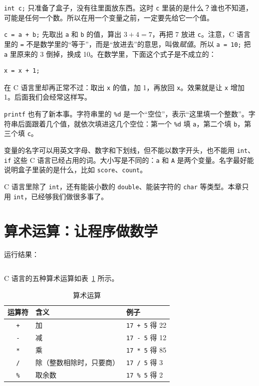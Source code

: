 \texttt{int c;} 只准备了盒子，没有往里面放东西。这时 \texttt{c} 里装的是什么？谁也不知道，可能是任何一个数。所以在用一个变量之前，一定要先给它一个值。

\texttt{c = a + b;} 先取出 \texttt{a} 和 \texttt{b} 的值，算出 $3 + 4 = 7$，再把 7 放进 \texttt{c}。注意，C 语言里的 \texttt{=} 不是数学里的“等于”，而是“放进去”的意思，叫做\emph{赋值}。所以 \texttt{a = 10;} 把 \texttt{a} 里原来的 3 倒掉，换成 10。在数学里，下面这个式子是不成立的：
\begin{verbatim}
x = x + 1;
\end{verbatim}
在 C 语言里却再正常不过：取出 \texttt{x} 的值，加 1，再放回 \texttt{x}。效果就是让 \texttt{x} 增加 1。后面我们会经常这样写。

\texttt{printf} 也有了新本事。字符串里的 \texttt{\%d} 是一个“空位”，表示“这里填一个整数”。字符串后面跟着几个值，就依次填进这几个空位：第一个 \texttt{\%d} 填 \texttt{a}，第二个填 \texttt{b}，第三个填 \texttt{c}。

变量的名字可以用英文字母、数字和下划线，但不能以数字开头，也不能用 \texttt{int}、\texttt{if} 这些 C 语言已经占用的词。大小写是不同的：\texttt{a} 和 \texttt{A} 是两个变量。名字最好能说明盒子里装的是什么，比如 \texttt{score}、\texttt{count}。

C 语言里除了 \texttt{int}，还有能装小数的 \texttt{double}、能装字符的 \texttt{char} 等类型。本章只用 \texttt{int}，已经够我们做很多事了。

\section{算术运算：让程序做数学}
\label{sec:arith}


运行结果：
\inputminted[linenos=false]{text}{code/ch02/out/arith.txt}

C 语言的五种算术运算如表~\ref{tab:arith} 所示。

\begin{table}[htbp]
  \centering
  \caption{算术运算}
  \label{tab:arith}
  \begin{tabular}{cll}
    \toprule
    运算符 & 含义 & 例子 \\
    \midrule
    \texttt{+} & 加 & \texttt{17 + 5} 得 22 \\
    \texttt{-} & 减 & \texttt{17 - 5} 得 12 \\
    \texttt{*} & 乘 & \texttt{17 * 5} 得 85 \\
    \texttt{/} & 除（整数相除时，只要商） & \texttt{17 / 5} 得 3 \\
    \texttt{\%} & 取余数 & \texttt{17 \% 5} 得 2 \\
    \bottomrule
  \end{tabular}
\end{table}

